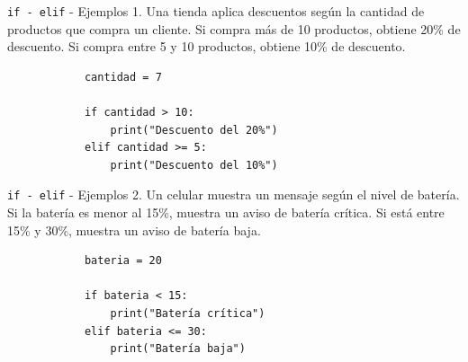 \documentclass{beamer}
\begin{document}
    \begin{frame}[fragile,t]{\texttt{if - elif} - Ejemplos}
        1. Una tienda aplica descuentos según la cantidad de productos que compra un cliente. 
        Si compra más de 10 productos, obtiene 20\% de descuento. 
        Si compra entre 5 y 10 productos, obtiene 10\% de descuento.
        
        \begin{verbatim}
            cantidad = 7

            if cantidad > 10:
                print("Descuento del 20%")
            elif cantidad >= 5:
                print("Descuento del 10%")
        \end{verbatim}
    \end{frame}

    \begin{frame}[fragile,t]{\texttt{if - elif} - Ejemplos}
        2. Un celular muestra un mensaje según el nivel de batería. Si la batería es menor al 15\%, 
        muestra un aviso de batería crítica. Si está entre 15\% y 30\%, 
        muestra un aviso de batería baja.
        \begin{verbatim}
            bateria = 20

            if bateria < 15:
                print("Batería crítica")
            elif bateria <= 30:
                print("Batería baja")
        \end{verbatim}
    \end{frame}


\end{document}
